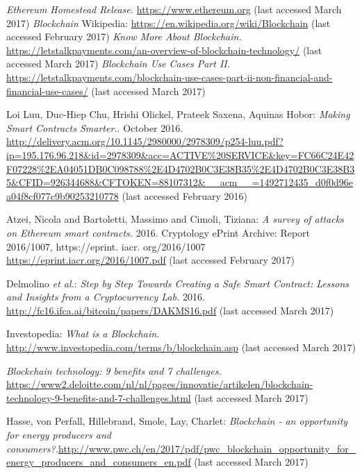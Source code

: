 \begin{thebibliography}{99}
\emph{Ethereum Homestead Release.} \url{https://www.ethereum.org} (last accessed March 2017)
\emph{Blockchain} Wikipedia: \url{https://en.wikipedia.org/wiki/Blockchain} (last accessed February 2017)
\emph{Know More About Blockchain.} \url{https://letstalkpayments.com/an-overview-of-blockchain-technology/} (last accessed March 2017)
\emph{Blockchain Use Cases Part II.} \url{https://letstalkpayments.com/blockchain-use-cases-part-ii-non-financial-and-financial-use-cases/} (last accessed March 2017)


Loi Luu, Duc-Hiep Chu, Hrishi Olickel, Prateek Saxena, Aquinas Hobor: \emph{Making Smart Contracts Smarter.}. October 2016. \url{http://delivery.acm.org/10.1145/2980000/2978309/p254-luu.pdf?ip=195.176.96.218&id=2978309&acc=ACTIVE\%20SERVICE&key=FC66C24E42F07228\%2EA04051DB0C098788\%2E4D4702B0C3E38B35\%2E4D4702B0C3E38B35&CFID=926344688&CFTOKEN=88107312&__acm__=1492712435_d0f0d96ea04f8cf077c9b90253210778} (last accessed February 2016)

Atzei, Nicola and Bartoletti, Massimo and Cimoli, Tiziana: \emph{A survey of attacks on Ethereum smart contracts.} 2016. Cryptology ePrint Archive: Report 2016/1007, https://eprint. iacr. org/2016/1007 \url{https://eprint.iacr.org/2016/1007.pdf} (last accessed February 2017)


Delmolino \textit{et al.}: \emph{Step by Step Towards Creating a Safe Smart Contract: Lessons and Insights from a Cryptocurrency Lab.} 2016.  \url{http://fc16.ifca.ai/bitcoin/papers/DAKMS16.pdf} (last accessed March 2017)




Investopedia: \emph{What is a Blockchain.} \url{http://www.investopedia.com/terms/b/blockchain.asp} (last accessed March 2017)

\emph{Blockchain technology: 9 benefits and 7 challenges.} \url{https://www2.deloitte.com/nl/nl/pages/innovatie/artikelen/blockchain-technology-9-benefits-and-7-challenges.html} (last accessed March 2017)

Hasse, von Perfall, Hillebrand, Smole, Lay, Charlet: \emph{Blockchain - an opportunity for energy producers and consumers?.}\url{http://www.pwc.ch/en/2017/pdf/pwc_blockchain_opportunity_for_energy_producers_and_consumers_en.pdf} (last accessed March 2017)


\end{thebibliography}
